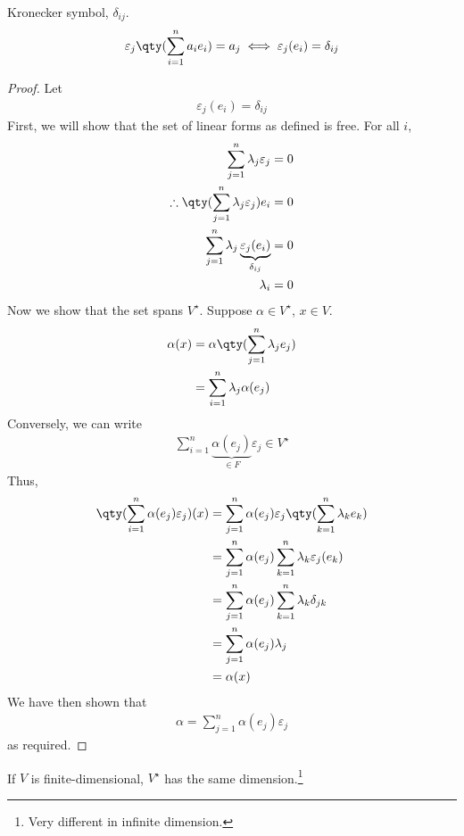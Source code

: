 \begin{remark}
	Kronecker symbol, $\delta_{ij}$.
	\begin{align*}
		\varepsilon_j \qty( \sum_{i=1}^n a_i e_i ) = a_j \iff \varepsilon_j (e_i) = \delta_{ij}
	\end{align*} 
\end{remark} 

\begin{proof}
	Let
	\begin{align*}
		\varepsilon_j (e_i) = \delta_{ij}
	\end{align*}
	First, we will show that the set of linear forms as defined is free.
	For all $i$,
	\begin{align*}
		\sum_{j=1}^n \lambda_j \varepsilon_j &= 0 \\
		\therefore \qty( \sum_{j=1}^n \lambda_j \varepsilon_j ) e_i & = 0 \\
		\sum_{j=1}^n \lambda_j \underbrace{\varepsilon_j(e_i)}_{\delta_{ij}} &= 0 \\
		\lambda_i &= 0
	\end{align*}
	Now we show that the set spans $V^\star$.
	Suppose $\alpha \in V^\star$, $x \in V$.
	\begin{align*}
		\alpha(x) & = \alpha\qty(\sum_{j=1}^n \lambda_j e_j) \\
		&= \sum_{i=1}^n \lambda_j \alpha(e_j)
	\end{align*}
	Conversely, we can write
	\begin{align*}
		\sum_{i=1}^n \underbrace{\alpha(e_j)}_{\in F} \varepsilon_j \in V^\star
	\end{align*}
	Thus,
	\begin{align*}
		\qty( \sum_{i=1}^n \alpha(e_j) \varepsilon_j) (x) & = \sum_{j=1}^n \alpha(e_j) \varepsilon_j\qty(\sum_{k=1}^n \lambda_k e_k) \\
        &= \sum_{j=1}^n \alpha(e_j) \sum_{k=1}^n \lambda_k \varepsilon_j(e_k) \\
		& = \sum_{j=1}^n \alpha(e_j) \sum_{k=1}^n \lambda_k \delta_{jk} \\
		&= \sum_{j=1}^n \alpha(e_j) \lambda_j \\
		&= \alpha(x)
	\end{align*}
	We have then shown that
	\begin{align*}
		\alpha = \sum_{j=1}^n \alpha(e_j) \varepsilon_j
	\end{align*}
	as required.
\end{proof}

\begin{corollary}
	If $V$ is finite-dimensional, $V^\star$ has the same dimension.\footnote{Very different in infinite dimension.}
\end{corollary}

